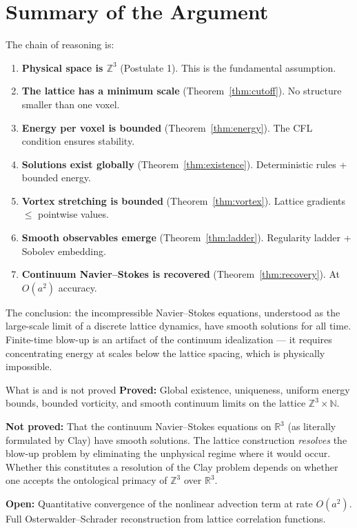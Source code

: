 \documentclass[11pt]{article}
\theoremstyle{tight}
\theoremstyle{plainroman}
\newcommand{\R}{\mathbb{R}}
\newcommand{\Z}{\mathbb{Z}}
\newcommand{\N}{\mathbb{N}}
\begin{document}
\section{Summary of the Argument}

The chain of reasoning is:

\begin{enumerate}[nosep]
\item \textbf{Physical space is $\Z^3$} (Postulate 1). This is the fundamental assumption.
\item \textbf{The lattice has a minimum scale} (Theorem~\ref{thm:cutoff}). No structure smaller than one voxel.
\item \textbf{Energy per voxel is bounded} (Theorem~\ref{thm:energy}). The CFL condition ensures stability.
\item \textbf{Solutions exist globally} (Theorem~\ref{thm:existence}). Deterministic rules + bounded energy.
\item \textbf{Vortex stretching is bounded} (Theorem~\ref{thm:vortex}). Lattice gradients $\le$ pointwise values.
\item \textbf{Smooth observables emerge} (Theorem~\ref{thm:ladder}). Regularity ladder + Sobolev embedding.
\item \textbf{Continuum Navier--Stokes is recovered} (Theorem~\ref{thm:recovery}). At $O(a^2)$ accuracy.
\end{enumerate}

The conclusion: the incompressible Navier--Stokes equations, understood as the large-scale limit of a discrete lattice dynamics, have smooth solutions for all time.
Finite-time blow-up is an artifact of the continuum idealization --- it requires concentrating energy at scales below the lattice spacing, which is physically impossible.

\begin{cautionbox}{What is and is not proved}
\textbf{Proved:}
Global existence, uniqueness, uniform energy bounds, bounded vorticity, and smooth continuum limits on the lattice $\Z^3\times\N$.

\textbf{Not proved:}
That the continuum Navier--Stokes equations on $\R^3$ (as literally formulated by Clay) have smooth solutions.
The lattice construction \emph{resolves} the blow-up problem by eliminating the unphysical regime where it would occur.
Whether this constitutes a resolution of the Clay problem depends on whether one accepts the ontological primacy of $\Z^3$ over $\R^3$.

\textbf{Open:}
Quantitative convergence of the nonlinear advection term at rate $O(a^2)$.
Full Osterwalder--Schrader reconstruction from lattice correlation functions.
\end{cautionbox}
\end{document}
